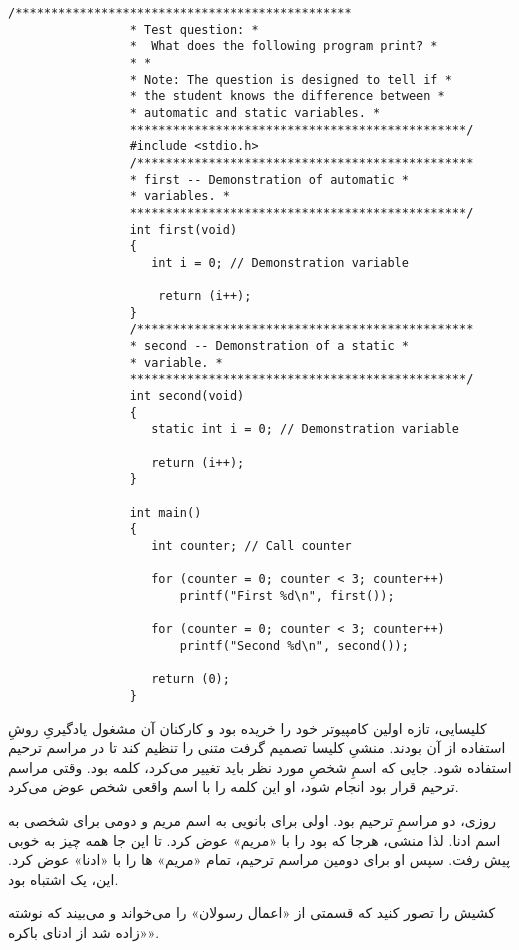 \begin{LTR}
            \begin{lstlisting}[style=C++Style]
                 /***********************************************
                 * Test question: *
                 * 	What does the following program print? *
                 * *
                 * Note: The question is designed to tell if *
                 * the student knows the difference between *
                 * automatic and static variables. *
                 ***********************************************/
                 #include <stdio.h>
                 /***********************************************
                 * first -- Demonstration of automatic *
                 * variables. *
                 ***********************************************/
                 int first(void)
                 {
                 	int i = 0; // Demonstration variable

                	 return (i++);
                 }
                 /***********************************************
                 * second -- Demonstration of a static *
                 * variable. *
                 ***********************************************/
                 int second(void)
                 {
                 	static int i = 0; // Demonstration variable

                 	return (i++);
                 }

                 int main()
                 {
                 	int counter; // Call counter

                 	for (counter = 0; counter < 3; counter++)
                 		printf("First %d\n", first());

                	for (counter = 0; counter < 3; counter++)
                 		printf("Second %d\n", second());

                 	return (0);
                 }
            \end{lstlisting}
\end{LTR}

\begin{tcolorbox}
    کلیسایی، تازه اولین کامپیوتر خود را خریده بود و کارکنان آن مشغول یادگیریِ روشِ استفاده از آن بودند. منشیِ کلیسا تصمیم گرفت متنی را تنظیم کند تا در مراسم ترحیم استفاده شود. جایی که اسمِ شخصِ مورد نظر باید تغییر می‌کرد، کلمه  بود. وقتی مراسم ترحیم قرار بود انجام شود، او این کلمه را با اسم واقعی شخص عوض می‌کرد.

    روزی، دو مراسمِ ترحیم بود. اولی برای بانویی به اسم مریم و دومی برای شخصی به اسم ادنا. لذا منشی، هرجا که  بود را با «مریم» عوض کرد. تا این جا همه چیز به خوبی پیش رفت. سپس او برای دومین مراسم ترحیم، تمام «مریم» ها را با «ادنا» عوض کرد. این، یک اشتباه بود.

    کشیش را تصور کنید که قسمتی از «اعمال رسولان» را می‌خواند و می‌بیند که نوشته «زاده شد از ادنای باکره».
\end{tcolorbox}